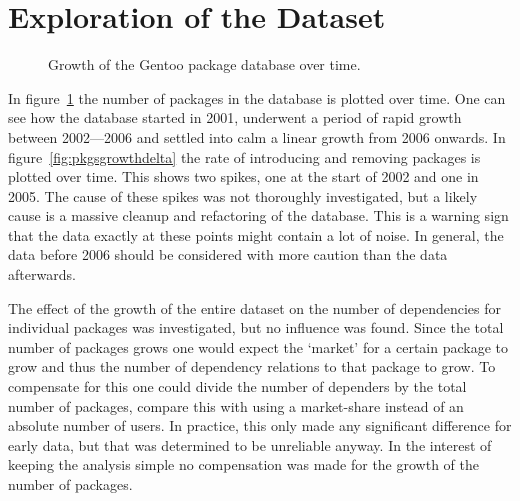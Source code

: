 \documentclass[smallextended,final]{svjour3}
\begin{document}
\section{Exploration of the Dataset}

\begin{figure}
\small\centering
{}
\caption{Growth of the Gentoo package database over time.}\label{fig:pkgsgrowth}
\end{figure}

In figure~\ref{fig:pkgsgrowth} the number of packages in the database is plotted over time. One can see how the database started in 2001, underwent a period of rapid growth between 2002---2006 and settled into calm a linear growth from 2006 onwards. In figure~\ref{fig:pkgsgrowthdelta} the rate of introducing and removing packages is plotted over time. This shows two spikes, one at the start of 2002 and one in 2005. The cause of these spikes was not thoroughly investigated, but a likely cause is a massive cleanup and refactoring of the database. This is a warning sign that the data exactly at these points might contain a lot of noise. In general, the data before 2006 should be considered with more caution than the data afterwards.

The effect of the growth of the entire dataset on the number of dependencies for individual packages was investigated, but no influence was found. Since the total number of packages grows one would expect the `market' for a certain package to grow and thus the number of dependency relations to that package to grow. To compensate for this one could divide the number of dependers by the total number of packages, compare this with using a market-share instead of an absolute number of users. In practice, this only made any significant difference for early data, but that was determined to be unreliable anyway. In the interest of keeping the analysis simple no compensation was made for the growth of the number of packages.
\end{document}
